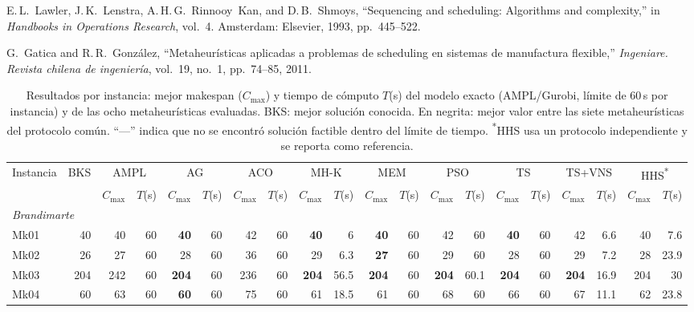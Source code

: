 \documentclass[conference]{IEEEtran}
\begin{document}
\begin{thebibliography}{25}
E.\,L.~Lawler, J.\,K.~Lenstra, A.\,H.\,G.~Rinnooy~Kan, and
D.\,B.~Shmoys,
``Sequencing and scheduling: Algorithms and complexity,''
in \textit{Handbooks in Operations Research}, vol.~4.
Amsterdam: Elsevier, 1993, pp.~445--522.

G.~Gatica and R.\,R.~Gonz\'alez,
``Metaheur\'isticas aplicadas a problemas de scheduling en sistemas
de manufactura flexible,''
\textit{Ingeniare. Revista chilena de ingenier\'ia}, vol.~19,
no.~1, pp.~74--85, 2011.

\begin{table}[tp]
\caption{Resultados por instancia: mejor makespan ($C_{\max}$) y tiempo de c\'omputo $T$(s) del modelo exacto (AMPL/Gurobi, l\'imite de 60\,s por instancia) y de las ocho metaheur\'isticas evaluadas. BKS: mejor soluci\'on conocida. En negrita: mejor valor entre las siete metaheur\'isticas del protocolo com\'un. ``---'' indica que no se encontr\'o soluci\'on factible dentro del l\'imite de tiempo. \textsuperscript{*}HHS usa un protocolo independiente y se reporta como referencia.}
\label{tab:resultados_completos}
\centering\scriptsize
\setlength{\tabcolsep}{2.6pt}
\begin{tabular}{lr rr rr rr rr rr rr rr rr rr}
\hline
\multirow{2}{*}{Instancia} & \multirow{2}{*}{BKS} & \multicolumn{2}{c}{AMPL} & \multicolumn{2}{c}{AG} & \multicolumn{2}{c}{ACO} & \multicolumn{2}{c}{MH-K} & \multicolumn{2}{c}{MEM} & \multicolumn{2}{c}{PSO} & \multicolumn{2}{c}{TS} & \multicolumn{2}{c}{TS+VNS} & \multicolumn{2}{c}{HHS\textsuperscript{*}} \\
 &  & $C_{\max}$ & $T$(s) & $C_{\max}$ & $T$(s) & $C_{\max}$ & $T$(s) & $C_{\max}$ & $T$(s) & $C_{\max}$ & $T$(s) & $C_{\max}$ & $T$(s) & $C_{\max}$ & $T$(s) & $C_{\max}$ & $T$(s) & $C_{\max}$ & $T$(s) \\
\hline
\multicolumn{20}{l}{\emph{Brandimarte}} \\
Mk01 & 40 & 40 & 60 & \textbf{40} & 60 & 42 & 60 & \textbf{40} & 6 & \textbf{40} & 60 & 42 & 60 & \textbf{40} & 60 & 42 & 6.6 & 40 & 7.6 \\
Mk02 & 26 & 27 & 60 & 28 & 60 & 36 & 60 & 29 & 6.3 & \textbf{27} & 60 & 29 & 60 & 28 & 60 & 29 & 7.2 & 28 & 23.9 \\
Mk03 & 204 & 242 & 60 & \textbf{204} & 60 & 236 & 60 & \textbf{204} & 56.5 & \textbf{204} & 60 & \textbf{204} & 60.1 & \textbf{204} & 60 & \textbf{204} & 16.9 & 204 & 30 \\
Mk04 & 60 & 63 & 60 & \textbf{60} & 60 & 75 & 60 & 61 & 18.5 & 61 & 60 & 68 & 60 & 66 & 60 & 67 & 11.1 & 62 & 23.8 \\

\end{tabular}
\end{table}
\end{thebibliography}
\end{document}
